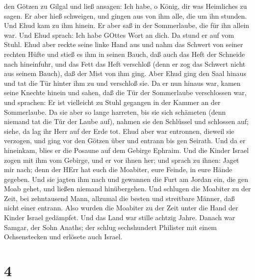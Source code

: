 den Götzen zu Gilgal und ließ ansagen: Ich habe, o König, dir was
Heimliches zu sagen. Er aber hieß schweigen, und gingen aus von ihm
alle, die um ihn stunden.  Und Ehud kam zu ihm hinein. Er
aber saß in der Sommerlaube, die für ihn allein war. Und Ehud sprach:
Ich habe GOttes Wort an dich. Da stund er auf vom Stuhl. 
Ehud aber reckte seine linke Hand aus und nahm das Schwert von seiner
rechten Hüfte und stieß es ihm in seinen Bauch,  daß auch
das Heft der Schneide nach hineinfuhr, und das Fett das Heft verschloß
(denn er zog das Schwert nicht aus seinem Bauch), daß der Mist von ihm
ging.  Aber Ehud ging den Saal hinaus und tat die Tür
hinter ihm zu und verschloß sie.  Da er nun hinaus war,
kamen seine Knechte hinein und sahen, daß die Tür der Sommerlaube
verschlossen war, und sprachen: Er ist vielleicht zu Stuhl gegangen in
der Kammer an der Sommerlaube.  Da sie aber so lange
harreten, bis sie sich schämeten (denn niemand tat die Tür der Laube
auf), nahmen sie den Schlüssel und schlossen auf; siehe, da lag ihr Herr
auf der Erde tot.  Ehud aber war entronnen, dieweil sie
verzogen, und ging vor den Götzen über und entrann bis gen Seirath.
 Und da er hineinkam, blies er die Posaune auf dem Gebirge
Ephraim. Und die Kinder Israel zogen mit ihm vom Gebirge, und er vor
ihnen her;  und sprach zu ihnen: Jaget mir nach; denn der
HErr hat euch die Moabiter, eure Feinde, in eure Hände gegeben. Und sie
jagten ihm nach und gewannen die Furt am Jordan ein, die gen Moab gehet,
und ließen niemand hinübergehen.  Und schlugen die Moabiter
zu der Zeit, bei zehntausend Mann, allzumal die besten und streitbare
Männer, daß nicht einer entrann.  Also wurden die Moabiter
zu der Zeit unter die Hand der Kinder Israel gedämpfet. Und das Land war
stille achtzig Jahre.  Danach war Samgar, der Sohn Anaths;
der schlug sechshundert Philister mit einem Ochsenstecken und erlösete
auch Israel.

\hypertarget{section-3}{%
\section{4}\label{section-3}}

